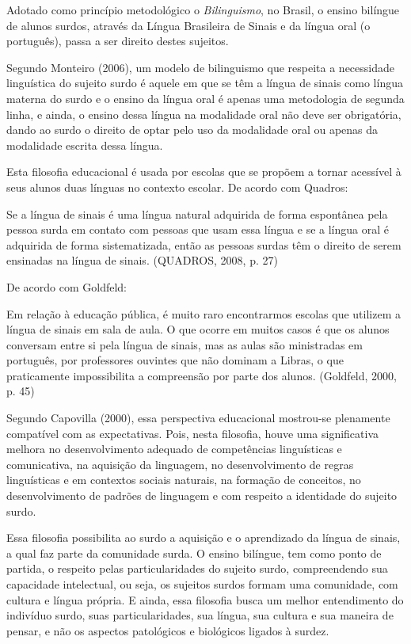 \documentclass[brasil]{abnt}
\begin{document}
			Adotado como princípio metodológico o \textit{Bilinguismo}, no Brasil, o ensino bilíngue de alunos surdos, através da Língua Brasileira de Sinais e da língua oral (o português), passa a ser direito 
			destes sujeitos. 
			
			Segundo Monteiro (2006), um modelo de bilinguismo que respeita a necessidade linguística do sujeito surdo é aquele em que se têm a língua de sinais como língua materna do surdo e o ensino da língua 
			oral é apenas uma metodologia de segunda linha, e ainda, o ensino dessa língua na modalidade oral não deve ser obrigatória, dando ao surdo o direito de optar pelo uso da modalidade oral ou apenas 
			da modalidade escrita dessa língua.
						
			Esta filosofia educacional é usada por escolas que se propõem a tornar acessível à seus alunos duas línguas no contexto escolar. De acordo com Quadros:
			
				\begin{citacao} Se a língua de sinais é uma língua natural adquirida de forma espontânea pela pessoa surda em contato com pessoas que usam essa língua e se a língua oral é adquirida de forma 
								sistematizada, então as pessoas surdas têm o direito de serem ensinadas na língua de sinais. (QUADROS, 2008, p. 27) 		
				\end{citacao}
			
			De acordo com Goldfeld:
			
				\begin{citacao} Em relação à educação pública, é muito raro encontrarmos escolas que utilizem a língua de sinais em sala de aula. O que ocorre em muitos casos é que os alunos conversam entre 
								si pela língua de sinais, mas as aulas são ministradas em português, por professores ouvintes que não dominam a Libras, o que praticamente impossibilita a compreensão por parte
								dos alunos. (Goldfeld, 2000, p. 45)
				\end{citacao}
			
			Segundo Capovilla (2000), essa perspectiva educacional mostrou-se plenamente compatível com as expectativas. Pois, nesta filosofia, houve uma significativa melhora no desenvolvimento adequado de 
			competências linguísticas e comunicativa, na aquisição da linguagem, no desenvolvimento de regras linguísticas e em contextos sociais naturais, na formação de conceitos, no desenvolvimento de 
			padrões de linguagem e com respeito a identidade do sujeito surdo.  
			
			Essa filosofia possibilita ao surdo a aquisição e o aprendizado da língua de sinais, a qual faz parte da comunidade surda. O ensino bilíngue, tem como ponto de partida, o respeito pelas 
			particularidades do sujeito surdo, compreendendo sua capacidade intelectual, ou seja, os sujeitos surdos formam uma comunidade, com cultura e língua própria. E ainda, essa filosofia busca um melhor 
			entendimento do indivíduo surdo, suas particularidades, sua língua, sua cultura e sua maneira de pensar, e não os aspectos patológicos e biológicos ligados à surdez.
			
\end{document}
